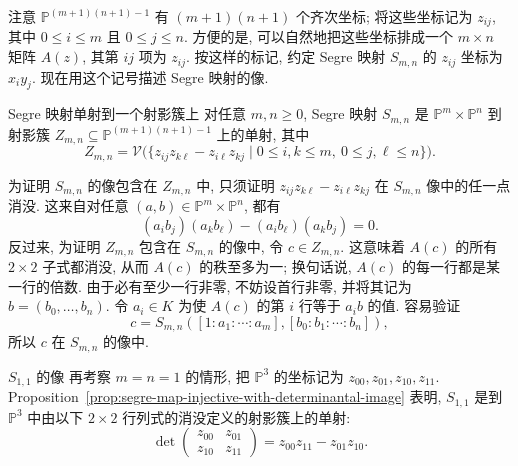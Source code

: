 注意 $\mathbb{P}^{(m+1)(n+1)-1}$ 有 $(m+1)(n+1)$ 个齐次坐标; 将这些坐标记为 $z_{ij}$, 其中 $0\le i\le m$ 且 $0\le j\le n$. 方便的是, 可以自然地把这些坐标排成一个 $m\times n$ 矩阵 $A(z)$, 其第 $ij$ 项为 $z_{ij}$. 按这样的标记, 约定 Segre 映射 $S_{m,n}$ 的 $z_{ij}$ 坐标为 $x_{i}y_{j}$. 现在用这个记号描述 Segre 映射的像.

\begin{Proposition}{Segre 映射单射到一个射影簇上}\leavevmode\label{prop:segre-map-injective-with-determinantal-image}
对任意 $m,n\ge0$, Segre 映射 $S_{m,n}$ 是 $\mathbb{P}^{m}\times\mathbb{P}^{n}$ 到射影簇 $Z_{m,n}\subseteq\mathbb{P}^{(m+1)(n+1)-1}$ 上的单射, 其中
\[
  Z_{m,n}=\mathcal{V}\bigl(\{z_{ij}z_{k\ell}-z_{i\ell}z_{kj}
      \mid 0\le i,k\le m,\ 0\le j,\ell\le n\}\bigr).
\]
\end{Proposition}
\begin{Proof}
为证明 $S_{m,n}$ 的像包含在 $Z_{m,n}$ 中, 只须证明 $z_{ij}z_{k\ell}-z_{i\ell}z_{kj}$ 在 $S_{m,n}$ 像中的任一点消没. 这来自对任意 $(a,b)\in\mathbb{P}^{m}\times\mathbb{P}^{n}$, 都有
\[
  (a_{i}b_{j})(a_{k}b_{\ell})-(a_{i}b_{\ell})(a_{k}b_{j})=0.
\]
反过来, 为证明 $Z_{m,n}$ 包含在 $S_{m,n}$ 的像中, 令 $c\in Z_{m,n}$. 这意味着 $A(c)$ 的所有 $2\times2$ 子式都消没, 从而 $A(c)$ 的秩至多为一; 换句话说, $A(c)$ 的每一行都是某一行的倍数. 由于必有至少一行非零, 不妨设首行非零, 并将其记为 $b=(b_{0},\ldots,b_{n})$. 令 $a_{i}\in K$ 为使 $A(c)$ 的第 $i$ 行等于 $a_{i}b$ 的值. 容易验证
\[
  c=S_{m,n}([1:a_{1}:\cdots:a_{m}],[b_{0}:b_{1}:\cdots:b_{n}]),
\]
所以 $c$ 在 $S_{m,n}$ 的像中.
\end{Proof}

\begin{Example}{$S_{1,1}$ 的像}\leavevmode\label{ex:segre-image-of-two-projective-lines}
再考察 $m=n=1$ 的情形, 把 $\mathbb{P}^{3}$ 的坐标记为 $z_{00},z_{01},z_{10},z_{11}$. Proposition~\ref{prop:segre-map-injective-with-determinantal-image} 表明, $S_{1,1}$ 是到 $\mathbb{P}^{3}$ 中由以下 $2\times2$ 行列式的消没定义的射影簇上的单射:
\[
  \det\begin{pmatrix}
    z_{00}&z_{01}\\
    z_{10}&z_{11}
  \end{pmatrix}=z_{00}z_{11}-z_{01}z_{10}.
\]
\end{Example}


